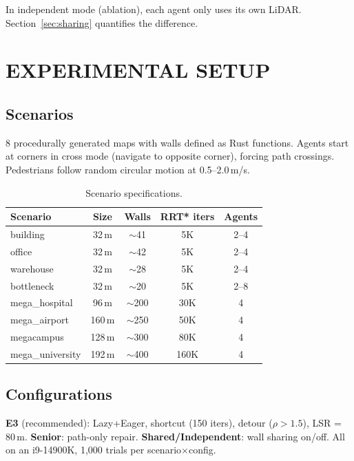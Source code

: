 \documentclass[letterpaper, 10pt, conference]{IEEEtran}
\begin{document}
In independent mode (ablation), each agent only uses its own LiDAR. Section~\ref{sec:sharing} quantifies the difference.

\section{EXPERIMENTAL SETUP}

\subsection{Scenarios}

8 procedurally generated maps with walls defined as Rust functions. Agents start at corners in cross mode (navigate to opposite corner), forcing path crossings. Pedestrians follow random circular motion at 0.5--2.0\,m/s.

\begin{table}[t]
\centering
\caption{Scenario specifications.}
\label{tab:scenarios}
\begin{tabular}{lcccc}
\toprule
Scenario & Size & Walls & RRT* iters & Agents \\
\midrule
building     & 32\,m  & ${\sim}$41  & 5K   & 2--4 \\
office       & 32\,m  & ${\sim}$42  & 5K   & 2--4 \\
warehouse    & 32\,m  & ${\sim}$28  & 5K   & 2--4 \\
bottleneck   & 32\,m  & ${\sim}$20  & 5K   & 2--8 \\
mega\_hospital  & 96\,m  & ${\sim}$200 & 30K  & 4 \\
mega\_airport   & 160\,m & ${\sim}$250 & 50K  & 4 \\
megacampus      & 128\,m & ${\sim}$300 & 80K  & 4 \\
mega\_university & 192\,m & ${\sim}$400 & 160K & 4 \\
\bottomrule
\end{tabular}
\end{table}

\subsection{Configurations}

\textbf{E3} (recommended): Lazy+Eager, shortcut (150 iters), detour ($\rho > 1.5$), LSR = 80\,m. \textbf{Senior}: path-only repair. \textbf{Shared/Independent}: wall sharing on/off. All on an i9-14900K, 1{,}000 trials per scenario$\times$config.
\end{document}
